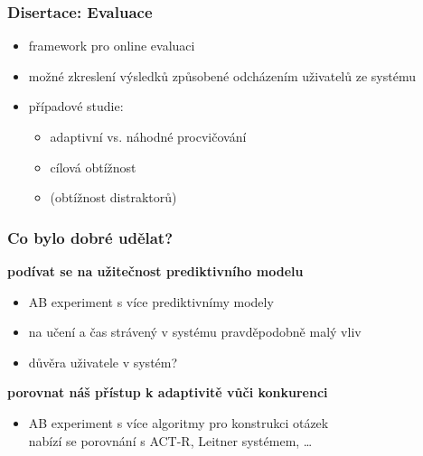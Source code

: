 \documentclass[xcolor=svgnames]{beamer}
\begin{document}
\begin{frame}
	\frametitle{Disertace: Evaluace}
	\begin{itemize}
		\item framework pro online evaluaci
		\item možné zkreslení výsledků způsobené odcházením uživatelů ze systému
		\item případové studie:
			\begin{itemize}
				\item adaptivní vs. náhodné procvičování
				\item cílová obtížnost
				\item (obtížnost distraktorů)
			\end{itemize}
	\end{itemize}
\end{frame}
\begin{frame}
	\frametitle{Co bylo dobré udělat?}
	\textbf{podívat se na užitečnost prediktivního modelu}
	\begin{itemize}
		\item AB experiment s více prediktivnímy modely
		\item na učení a čas strávený v systému pravděpodobně malý vliv
		\item důvěra uživatele v systém?
	\end{itemize}
	\pause
	\textbf{porovnat náš přístup k adaptivitě vůči konkurenci}
	\begin{itemize}
		\item AB experiment s více algoritmy pro konstrukci otázek\\
			{\tiny nabízí se porovnání s ACT-R, Leitner systémem, \ldots}
	\end{itemize}
\end{frame}
\end{document}
